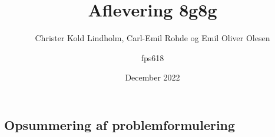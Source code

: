 \documentclass{article}
\title{Aflevering 8g}
\author{Christer Kold Lindholm, Carl-Emil Rohde og Emil Oliver Olesen }
\title{8g}
\author{fps618 }
\date{December 2022}
\begin{document}
\maketitle

\subsection{Opsummering af problemformulering}
\end{document}
